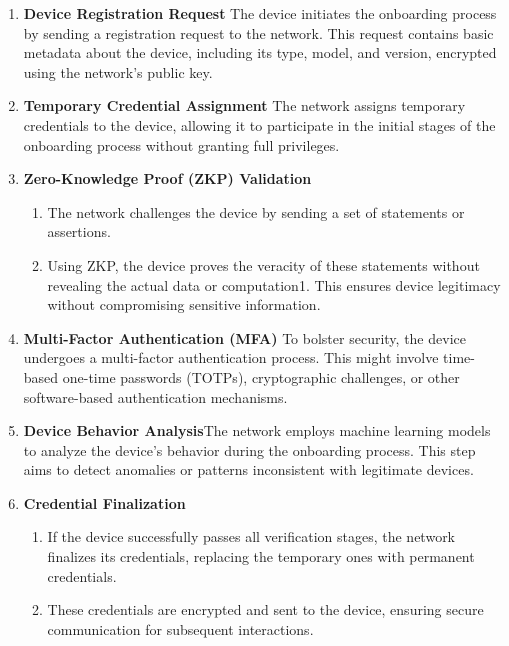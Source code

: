 \documentclass{article}
\begin{document}
\begin{enumerate}

\item \textbf{Device Registration Request} The device initiates the onboarding process by sending a registration request to the network. This request contains basic metadata about the device, including its type, model, and version, encrypted using the network's public key.

\item \textbf{Temporary Credential Assignment} The network assigns temporary credentials to the device, allowing it to participate in the initial stages of the onboarding process without granting full privileges.

\item \textbf{Zero-Knowledge Proof (ZKP) Validation}
      \begin{enumerate}
            \item The network challenges the device by sending a set of statements or assertions.
            \item Using ZKP, the device proves the veracity of these statements without revealing the actual data or computation1. This ensures device legitimacy without compromising sensitive information.
       \end{enumerate}
\item \textbf{Multi-Factor Authentication (MFA)} To bolster security, the device undergoes a multi-factor authentication process. This might involve time-based one-time passwords (TOTPs), cryptographic challenges, or other software-based authentication mechanisms.

\item \textbf{Device Behavior Analysis}The network employs machine learning models to analyze the device's behavior during the onboarding process. This step aims to detect anomalies or patterns inconsistent with legitimate devices.

\item \textbf{Credential Finalization}
\begin{enumerate}
\item  If the device successfully passes all verification stages, the network finalizes its credentials, replacing the temporary ones with permanent credentials.
\item These credentials are encrypted and sent to the device, ensuring secure communication for subsequent interactions.
\end{enumerate}


\end{enumerate}
\end{document}
